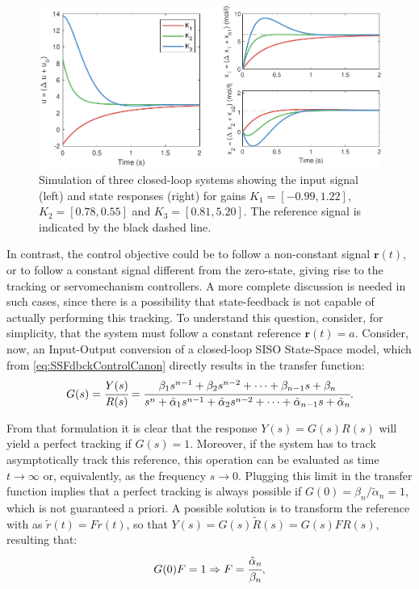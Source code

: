 \documentclass[a4paper,11pt]{book}
\numberwithin{figure}{chapter}
\numberwithin{equation}{chapter}
\numberwithin{table}{chapter}
\theoremstyle{definition}
\begin{document}
\begin{figure}[ht]
    \centering
    \includegraphics[width=\textwidth]{chapter3/report_ch3_1}
    \caption{Simulation of three closed-loop systems showing the input signal (left) and state responses (right) for gains $K_1 = [-0.99, 1.22]$, $K_2 = [0.78, 0.55]$ and $K_3 = [0.81, 5.20]$. The reference signal is indicated by the black dashed line.}
    \label{fig:regulator01}
\end{figure}

In contrast, the control objective could be to follow a non-constant signal $\bm{r}(t)$, or to follow a constant signal different from the zero-state, giving rise to the tracking or servomechanism controllers. A more complete discussion is needed in such cases, since there is a possibility that state-feedback is not capable of actually performing this tracking. To understand this question, consider, for simplicity, that the system must follow a constant reference $\bm{r}(t) = a$. Consider, now, an Input-Output conversion of a closed-loop SISO State-Space model, which from \eqref{eq:SSFdbckControlCanon} directly results in the transfer function:
\begin{equation}
    G(s) = \cfrac{Y(s)}{R(s)} = \cfrac{\beta_1 s^{n-1} + \beta_2 s^{n-2} + \cdots + \beta_{n-1} s + \beta_n}{s^{n} + \tilde{\alpha}_1 s^{n-1} + \tilde{\alpha}_2 s^{n-2} + \cdots + \tilde{\alpha}_{n-1} s + \tilde{\alpha}_n}
.\end{equation}

From that formulation it is clear that the response $Y(s) = G(s)R(s)$ will yield a perfect tracking if $G(s) = 1$. Moreover, if the system has to track asymptotically track this reference, this operation can be evaluated as time $t \to \infty$ or, equivalently, as the frequency $s \to 0$. Plugging this limit in the transfer function implies that a perfect tracking is always possible if $G(0) = \beta_n /  \tilde{\alpha}_n = 1$, which is not guaranteed a priori. A possible solution is to transform the reference with as $\tilde{r}(t) = F r(t)$, so that $Y(s) = G(s)\tilde{R}(s) = G(s) F R(s)$, resulting that:
\begin{equation}
    G(0) F = 1 \Rightarrow F = \cfrac{\tilde{\alpha}_n}{\beta_n}
,\end{equation}
\end{document}

